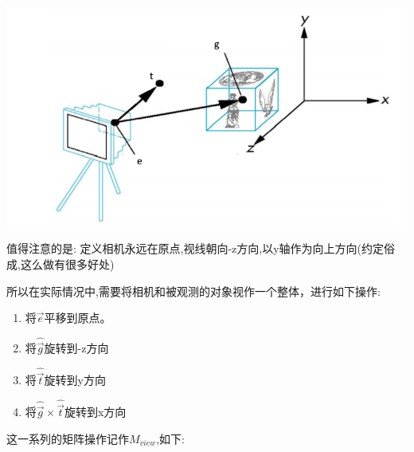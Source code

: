 \documentclass[UTF8]{ctexbook}
\begin{document}
{{{{\begin{itemize}
{                \includegraphics[scale=0.9]{resources/viewTransformation.png}

                值得注意的是: 定义相机永远在原点,视线朝向-z方向,以y轴作为向上方向(约定俗成,这么做有很多好处)

                所以在实际情况中,需要将相机和被观测的对象视作一个整体，进行如下操作:
                \begin{enumerate}
                  \item 将$\vec{e}$平移到原点。
                  \item 将$\hat{\vec{g}}$旋转到-z方向
                  \item 将$\hat{\vec{t}}$旋转到y方向
                  \item 将$\hat{\vec{g}} \times \hat{\vec{t}}$旋转到x方向
                \end{enumerate}

                这一系列的矩阵操作记作$M_{view}$,如下:

}
\end{itemize}}}}}
\end{document}
